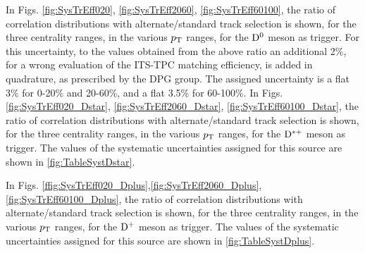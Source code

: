 In Figs. \ref{fig:SysTrEff020}, \ref{fig:SysTrEff2060}, \ref{fig:SysTrEff60100}, the ratio of correlation distributions with alternate/standard track selection is shown, for the three centrality ranges, in the various $p_{\rm T}$ ranges, for the ${\rm D^0}$ meson as trigger.
For this uncertainty, to the values obtained from the above ratio an additional 2\%, for a wrong evaluation of the ITS-TPC matching efficiency, is added in quadrature, as prescribed by the DPG group.
The assigned uncertainty is a flat 3\% for 0-20\% and 20-60\%, and a flat 3.5\% for 60-100\%.
In Figs. \ref{fig:SysTrEff020_Dstar}, \ref{fig:SysTrEff2060_Dstar}, \ref{fig:SysTrEff60100_Dstar}, the ratio of correlation distributions with alternate/standard track selection is shown, for the three centrality ranges, in the various $p_{\rm T}$ ranges, for the ${\rm D^{*+}}$ meson as trigger. The values of the systematic uncertainties assigned for this source are shown in \ref{fig:TableSystDstar}.

In Figs. \ref{ffig:SysTrEff020_Dplus},\ref{fig:SysTrEff2060_Dplus}, \ref{fig:SysTrEff60100_Dplus}, the ratio of correlation distributions with alternate/standard track selection is shown, for the three centrality ranges, in the various $p_{\rm T}$ ranges, for the ${\rm D^+}$ meson as trigger.
The values of the systematic uncertainties assigned for this source are shown in \ref{fig:TableSystDplus}.

